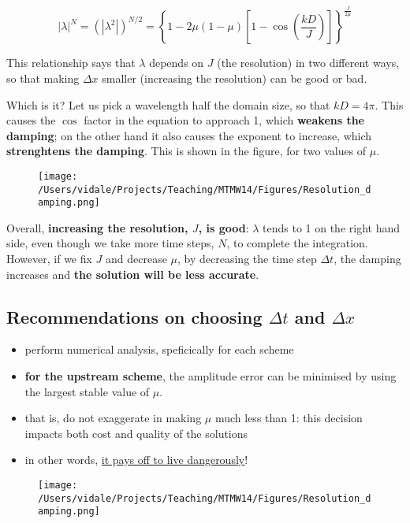 \begin{equation}
	|\lambda|^N=(|\lambda^2|)^{N/2} = \left \{ 1 -2 \mu (1-\mu) \left[ 1 - \cos ( \frac {k D} {J}) \right] \right \} ^{\frac {J}{2 \mu}}
\end{equation}

This relationship says that $\lambda$ depends on $J$ (the resolution) in two different ways, so that making $\Delta x$ smaller (increasing the resolution) can be good or bad. 

\medskip
Which is it?
Let us pick a wavelength half the domain size, so that $kD=4 \pi$. This causes the $\cos$ factor in the equation to approach 1, which \textbf{weakens the damping}; on the other hand it also causes the exponent to increase, which \textbf{strenghtens the damping}. This is shown in the figure, for two values of $\mu$.

	\begin{figure}
		\texttt{[image: /Users/vidale/Projects/Teaching/MTMW14/Figures/Resolution\_damping.png]}
	\end{figure}
\hfill
	Overall, \textbf{increasing the resolution, $J$, is good}: $\lambda$ tends to 1 on the right hand side, even though we take more time steps, $N$, to complete the integration. However, if we fix $J$ and decrease $\mu$, by decreasing the time step $\Delta t$, the damping increases and \textbf{the solution will be less accurate}. 
	


\subsection{Recommendations on choosing $\Delta t$ and $\Delta x $}

	\begin{itemize}
		\item perform numerical analysis, speficically for each scheme
		\item \textbf{for the upstream scheme}, the amplitude error can be minimised by using the largest stable value of $\mu$.
		\item that is, do not exaggerate in making $\mu$ much less than 1: this decision impacts both cost and quality of the solutions
		\item in other words, \underline{it pays off to live dangerously}!
	\end{itemize}
	\hfill
		\begin{figure}
			\texttt{[image: /Users/vidale/Projects/Teaching/MTMW14/Figures/Resolution\_damping.png]}
		\end{figure}


